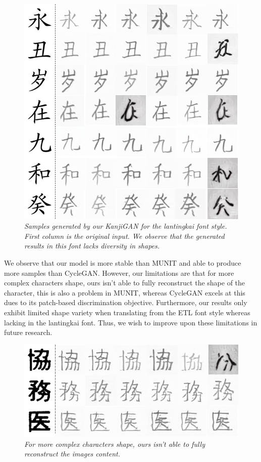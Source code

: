 \documentclass[12pt]{report}
\begin{document}
\begin{figure}[H]
	\centering
	\includegraphics[scale=0.9]{kanji-gan-results-3}
	\caption{\textit{Samples generated by our KanjiGAN for the lantingkai font style. First column is the original input. We observe that the generated results in this font lacks diversity in shapes.}}
	\label{fig:kanji-gan-results-3}
\end{figure}

We observe that our model is more stable than MUNIT and able to produce more samples than CycleGAN. However, our limitations are that for more complex characters shape, ours isn't able to fully reconstruct the shape of the character, this is also a problem in MUNIT, whereas CycleGAN excels at this dues to its patch-based discrimination objective. Furthermore, our results only exhibit limited shape variety when translating from the ETL font style whereas lacking in the lantingkai font. Thus, we wish to improve upon these limitations in future research.

\begin{figure}[H]
	\centering
	\includegraphics[scale=0.8]{kanji-gan-results-4}
	\caption{\textit{For more complex characters shape, ours isn't able to fully reconstruct the images content.}}
	\label{fig:kanji-gan-results-4}
\end{figure}
\end{document}
